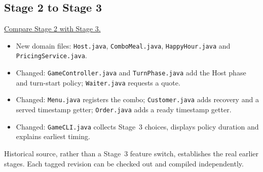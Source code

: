 \subsection{Stage 2 to Stage 3}
\href{https://github.com/SeraphinaXYX/NTU-SC2002-Restaurant-Rush/compare/stage-2...stage-3}{Compare Stage 2 with Stage 3.}
\begin{itemize}
\item New domain files: \texttt{Host.java}, \texttt{ComboMeal.java}, \texttt{HappyHour.java} and \texttt{PricingService.java}.
\item Changed: \texttt{GameController.java} and \texttt{TurnPhase.java} add the Host phase and turn-start policy; \texttt{Waiter.java} requests a quote.
\item Changed: \texttt{Menu.java} registers the combo; \texttt{Customer.java} adds recovery and a served timestamp getter; \texttt{Order.java} adds a ready timestamp getter.
\item Changed: \texttt{GameCLI.java} collects Stage~3 choices, displays policy duration and explains earliest timing.
\end{itemize}
Historical source, rather than a Stage~3 feature switch, establishes the real
earlier stages. Each tagged revision can be checked out and compiled independently.
